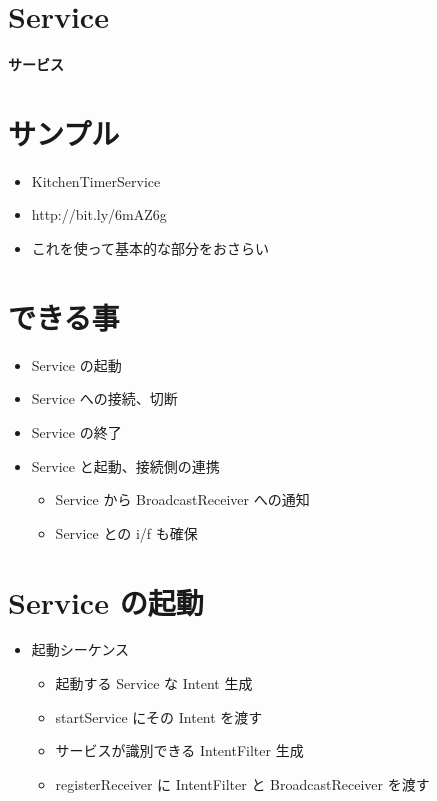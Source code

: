 \documentclass[slide,papersize]{jsarticle}
\begin{document}
\section*{Service}
\vspace*{15mm}
\begin{center}
{\Huge {\bf サービス}}
\end{center}

\section*{サンプル}
\bigskip
\begin{itemize}
\item KitchenTimerService
\bigskip
\item http://bit.ly/6mAZ6g
\bigskip
\item これを使って基本的な部分をおさらい
\end{itemize}

\section*{できる事}
\medskip
\begin{itemize}
\item Service の起動
\medskip
\item Service への接続、切断
\medskip
\item Service の終了
\medskip
\item Service と起動、接続側の連携
 \begin{itemize}
 \item Service から BroadcastReceiver への通知
 \item Service との i/f も確保
 \end{itemize}
\end{itemize}

\section*{Service の起動}
\medskip
\begin{itemize}
\item 起動シーケンス
 \begin{itemize}
 \medskip
 \item 起動する Service な Intent 生成
 \medskip
 \item startService にその Intent を渡す
 \medskip
 \item サービスが識別できる IntentFilter 生成
 \medskip
 \item registerReceiver に IntentFilter と BroadcastReceiver を渡す
 \end{itemize}
\end{itemize}
\end{document}
